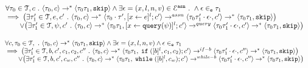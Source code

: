 %
\begin{lem}
\label{lem:inv_asn}
\[
\begin{array}{l}
	\forall \mathtt{\tau}_0 \in \mathcal{T}, c ~.~ \langle \mathtt{\tau}_0, c \rangle \rightarrow^* \langle \mathtt{\tau}_0\mathtt{\tau}_1, \mathtt{skip} \rangle
	\land \exists \mathtt{\epsilon} = (x, l, n, v) \in \mathcal{E}^{\mathtt{{asn}}} ~.~
	\land \mathtt{\epsilon} \in_{\mathtt{e}} \mathtt{\tau}_1 \\
	\implies 
	\big( 
		\exists \mathtt{\tau}_1' \in \mathcal{T}, e, c' ~.~
		\langle \mathtt{\tau}_0, c \rangle \rightarrow^* \langle \mathtt{\tau}_0 \cdot \mathtt{\tau}', [\mathrel{ x \leftarrow e }]^l;c' \rangle \rightarrow^{assn}
		\langle \mathtt{\tau}_0\mathtt{\tau}_1'\cdot \mathtt{\epsilon} \cdot, c' \rangle \rightarrow^{*}
		\langle \mathtt{\tau}_0\mathtt{\tau}_1, \mathtt{skip} \rangle
	\big)
	\\ \qquad \lor
	\big( 
		\exists \mathtt{\tau}_1' \in \mathcal{T}, \psi, c' ~.~
		\langle \mathtt{\tau}_0, c \rangle \rightarrow^* \langle \mathtt{\tau}_0\mathtt{\tau}_1, [\mathrel{ x \leftarrow {\tt query}(\psi) }]^l;c' \rangle \rightarrow^{query}
		\langle \mathtt{\tau}_0\mathtt{\tau}_1' \cdot \mathtt{\epsilon} \cdot, c' \rangle \rightarrow^{*}
		\langle \mathtt{\tau}_0\mathtt{\tau}_1, \mathtt{skip} \rangle
	\big)
\end{array}
\]
%
\end{lem}
%
\begin{lem}
\label{lem:inv_test}
\[
\begin{array}{l}
	\forall c, \mathtt{\tau}_0 \in \mathcal{T}, ~.~ \langle \mathtt{\tau}_0, c \rangle \rightarrow^* \langle \mathtt{\tau}_0\mathtt{\tau}_1, \mathtt{skip} \rangle
	\land \exists \mathtt{\epsilon} = (x, l, n, v) \land \mathtt{\epsilon} \in_{\mathtt{e}} \mathtt{\tau}_1 \\
	\implies 
	\big( 
		\exists \mathtt{\tau}_1' \in \mathcal{T}, b, c', c_1, c_2, c'' ~.~
		\langle \mathtt{\tau}_0, c \rangle \rightarrow^* \langle \mathtt{\tau}_0\mathtt{\tau}_1, \;\mathtt{if}\; ([b]^l, c_1, c_2);c' \rangle \rightarrow^{if-b}
		\langle \mathtt{\tau}_0\mathtt{\tau}_1'\cdot \mathtt{\epsilon} \cdot, c'' \rangle \rightarrow^{*}
		\langle \mathtt{\tau}_0\mathtt{\tau}_1, \mathtt{skip} \rangle 
	\big)
	\\ \qquad \lor
	\big( 
		\exists \mathtt{\tau}_1' \in \mathcal{T}, b, c', c_w, c'' ~.~
		\langle \mathtt{\tau}_0, c \rangle \rightarrow^* \langle \mathtt{\tau}_0 \mathtt{\tau}_1, \;\mathtt{while}\;([b]^l, c_w);c' \rangle \rightarrow^{while-b}
		\langle \mathtt{\tau}_0\mathtt{\tau}_1'\cdot \mathtt{\epsilon} \cdot, c'' \rangle \rightarrow^{*}
		\langle \mathtt{\tau}_0\mathtt{\tau}_1, \mathtt{skip} \rangle
	\big)
\end{array}
\]
\end{lem}

